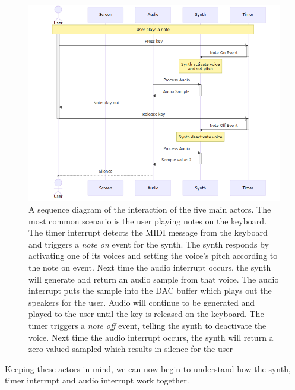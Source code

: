 \documentclass[acmlarge,screen]{acmart}
\begin{document}

	\begin{figure}[H]
		\centering
		\includegraphics[width=.7\linewidth]{play_note_sequence}
		\caption{A sequence diagram of the interaction of the five main actors. The most common scenario is the user playing notes on the keyboard. The timer interrupt detects the MIDI message from the keyboard and triggers a \textit{note on} event for the synth. The synth responds by activating one of its voices and setting the voice's pitch according to the note on event. Next time the audio interrupt occurs, the synth will generate and return an audio sample from that voice. The audio interrupt puts the sample into the DAC buffer which plays out the speakers for the user. Audio will continue to be generated and played to the user until the key is released on the keyboard. The timer triggers a \textit{note off} event, telling the synth to deactivate the voice. Next time the audio interrupt occurs, the synth will return a zero valued sampled which results in silence for the user}
	\end{figure}
	
	Keeping these actors in mind, we can now begin to understand how the synth, timer interrupt and audio interrupt work together.
	
\end{document}
